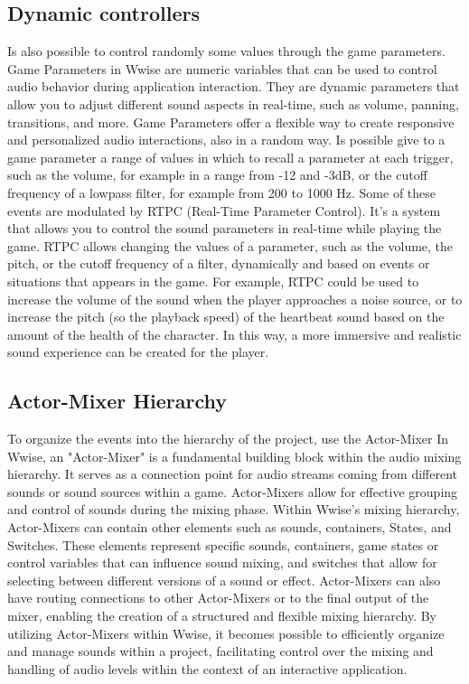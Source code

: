 	\subsection{Dynamic controllers}
	Is also possible to control randomly some values through the game parameters.
	Game Parameters in Wwise are numeric variables that can be used to control audio behavior during application interaction. They are dynamic parameters that allow you to adjust different sound aspects in real-time, such as volume, panning, transitions, and more. Game Parameters offer a flexible way to create responsive and personalized audio interactions, also in a random way. Is possible give to a game parameter a range of values ​​in which to recall a parameter at each trigger, such as the volume, for example in a range from -12 and -3dB, or the cutoff frequency of a lowpass filter, for example from 200 to 1000 Hz.
	Some of these events are modulated by RTPC (Real-Time Parameter Control). It's a system that allows you to control the sound parameters in real-time while playing the game.
	RTPC allows changing the values ​​of a parameter, such as the volume, the pitch, or the cutoff frequency of a filter, dynamically and based on events or situations that appears in the game. For example, RTPC could be used to increase the volume of the sound when the player approaches a noise source, or to increase the pitch (so the playback speed) of the heartbeat sound based on the amount of the health of the character. In this way, a more immersive and realistic sound experience can be created for the player.
	
	\subsection{Actor-Mixer Hierarchy}
	To organize the events into the hierarchy of the project, use the Actor-Mixer
	In Wwise, an "Actor-Mixer" is a fundamental building block within the audio mixing hierarchy. It serves as a connection point for audio streams coming from different sounds or sound sources within a game. Actor-Mixers allow for effective grouping and control of sounds during the mixing phase.
	Within Wwise's mixing hierarchy, Actor-Mixers can contain other elements such as sounds, containers, States, and Switches. These elements represent specific sounds, containers, game states or control variables that can influence sound mixing, and switches that allow for selecting between different versions of a sound or effect.
	Actor-Mixers can also have routing connections to other Actor-Mixers or to the final output of the mixer, enabling the creation of a structured and flexible mixing hierarchy.
	By utilizing Actor-Mixers within Wwise, it becomes possible to efficiently organize and manage sounds within a project, facilitating control over the mixing and handling of audio levels within the context of an interactive application.
	
